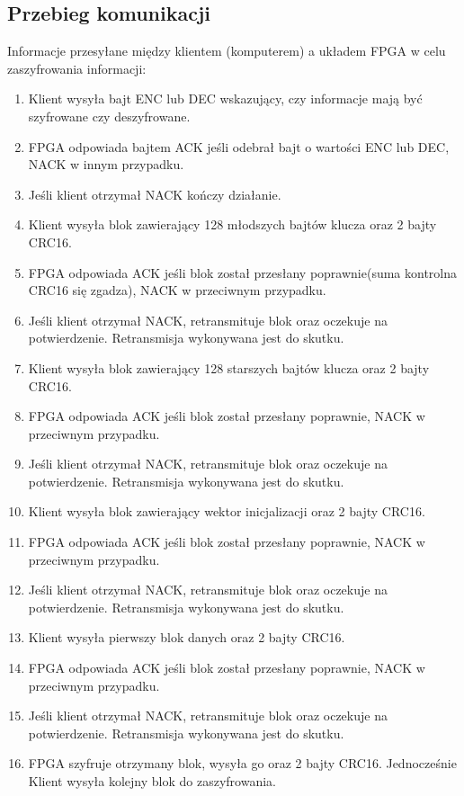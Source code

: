\subsection{Przebieg komunikacji}
\label{przebieg-komunikacji}
Informacje przesyłane między klientem (komputerem) a układem FPGA w celu zaszyfrowania informacji:
\begin{enumerate}[noitemsep]
\item Klient wysyła bajt ENC lub DEC wskazujący, czy informacje mają być szyfrowane czy deszyfrowane.
\item FPGA odpowiada bajtem ACK jeśli odebrał bajt o wartości ENC lub DEC, NACK w innym przypadku.
\item Jeśli klient otrzymał NACK kończy działanie.
\item Klient wysyła blok zawierający 128 młodszych bajtów klucza oraz 2 bajty CRC16.
\item FPGA odpowiada ACK jeśli blok został przesłany poprawnie(suma kontrolna CRC16 się zgadza), NACK w przeciwnym przypadku.
\item Jeśli klient otrzymał NACK, retransmituje blok oraz oczekuje na potwierdzenie. Retransmisja wykonywana jest do skutku.
\item Klient wysyła blok zawierający 128 starszych bajtów klucza oraz 2 bajty CRC16.
\item FPGA odpowiada ACK jeśli blok został przesłany poprawnie, NACK w przeciwnym przypadku.
\item Jeśli klient otrzymał NACK, retransmituje blok oraz oczekuje na potwierdzenie. Retransmisja wykonywana jest do skutku.
\item Klient wysyła blok zawierający wektor inicjalizacji oraz 2 bajty CRC16.
\item FPGA odpowiada ACK jeśli blok został przesłany poprawnie, NACK w przeciwnym przypadku.
\item Jeśli klient otrzymał NACK, retransmituje blok oraz oczekuje na potwierdzenie. Retransmisja wykonywana jest do skutku.
\item Klient wysyła pierwszy blok danych oraz 2 bajty CRC16.
\item FPGA odpowiada ACK jeśli blok został przesłany poprawnie, NACK w przeciwnym przypadku.
\item Jeśli klient otrzymał NACK, retransmituje blok oraz oczekuje na potwierdzenie. Retransmisja wykonywana jest do skutku.
\item FPGA szyfruje otrzymany blok, wysyła go oraz 2 bajty CRC16. Jednocześnie Klient wysyła kolejny blok do zaszyfrowania.

\end{enumerate}
